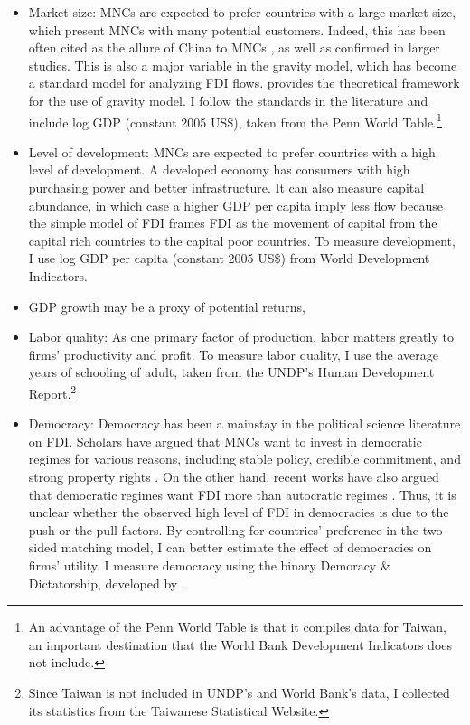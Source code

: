 \begin{itemize}
\item Market size: MNCs are expected to prefer countries with a large market
  size, which present MNCs with many potential customers. Indeed, this has been
  often cited as the allure of China to MNCs \citep{Luo2010}, as well as
  confirmed in larger studies. This is also a major variable in the gravity
  model, which has become a standard model for analyzing FDI flows.
  \citet{Bergstrand2007} provides the theoretical framework for the use of
  gravity model. I follow the standards in the literature and include log GDP
  (constant 2005 US\$), taken from the Penn World Table.\footnote{An advantage
    of the Penn World Table is that it compiles data for Taiwan, an important
    destination that the World Bank Development Indicators does not include.}

\item Level of development: MNCs are expected to prefer countries with a high
  level of development. A developed economy has consumers with high purchasing
  power and better infrastructure. It can also measure capital abundance, in
  which case a higher GDP per capita imply less flow because the simple model of
  FDI frames FDI as the movement of capital from the capital rich countries to
  the capital poor countries. To measure development, I use log GDP per capita
  (constant 2005 US\$) from World Development Indicators.

\item GDP growth may be a proxy of potential returns, 

\item Labor quality: As one primary factor of production, labor matters greatly to firms' productivity and profit. To measure labor quality, I use the average years of schooling of adult, taken from the UNDP's Human Development Report.\footnote{Since Taiwan is not included in UNDP's and World Bank's data, I collected its statistics from the Taiwanese Statistical Website.}

\item Democracy: Democracy has been a mainstay in the political science literature on FDI. Scholars have argued that MNCs want to invest in democratic regimes for various reasons, including stable policy, credible commitment, and strong property rights \citep{Ahlquist2006, Li2003, Jensen2003}. On the other hand, recent works have also argued that democratic regimes want FDI more than autocratic regimes \citep{Pandya2016}. Thus, it is unclear whether the observed high level of FDI in democracies is due to the push or the pull factors. By controlling for countries' preference in the two-sided matching model, I can better estimate the effect of democracies on firms' utility. I measure democracy using the binary Demoracy \& Dictatorship, developed by \citet{Cheibub2009b}.
\end{itemize}


